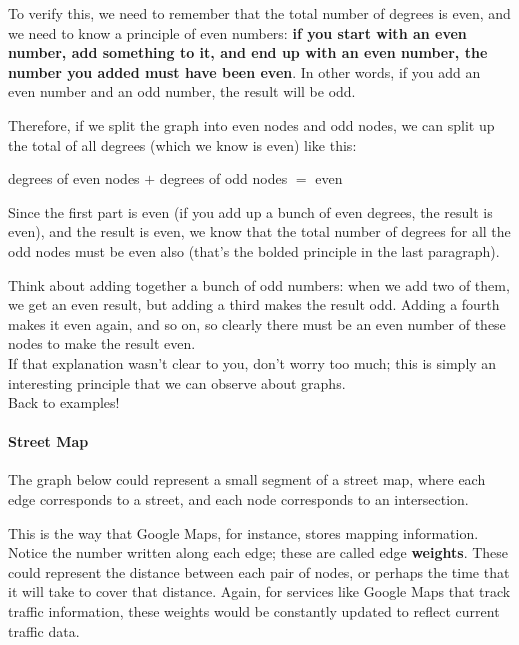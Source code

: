 To verify this, we need to remember that the total number of degrees is even, and we need to know a principle of even numbers: \textbf{if you start with an even number, add something to it, and end up with an even number, the number you added must have been even}.  In other words, if you add an even number and an odd number, the result will be odd.

Therefore, if we split the graph into even nodes and odd nodes, we can split up the total of all degrees (which we know is even) like this:
\begin{center}
degrees of even nodes $+$ degrees of odd nodes $=$ even
\end{center}
Since the first part is even (if you add up a bunch of even degrees, the result is even), and the result is even, we know that the total number of degrees for all the odd nodes must be even also (that's the bolded principle in the last paragraph).

Think about adding together a bunch of odd numbers: when we add two of them, we get an even result, but adding a third makes the result odd.  Adding a fourth makes it even again, and so on, so clearly there must be an even number of these nodes to make the result even.\\

If that explanation wasn't clear to you, don't worry too much; this is simply an interesting principle that we can observe about graphs.\\

Back to examples!
\vfill

\paragraph{Street Map} The graph below could represent a small segment of a street map, where each edge corresponds to a street, and each node corresponds to an intersection.

This is the way that Google Maps, for instance, stores mapping information.  Notice the number written along each edge; these are called edge \textbf{weights}.  These could represent the distance between each pair of nodes, or perhaps the time that it will take to cover that distance.  Again, for services like Google Maps that track traffic information, these weights would be constantly updated to reflect current traffic data.
\vfill

